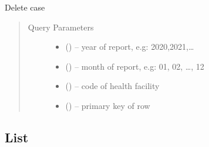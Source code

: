 \documentclass[letterpaper,10pt,english,openany,oneside]{sphinxmanual}
\begin{document}
\begin{fulllineitems}
\label{\detokenize{api/v4:post--api4-Reports-delete_hf_activity_case}}
\sphinxAtStartPar
Delete case
\begin{quote}\begin{description}
\item[{Query Parameters}] \leavevmode\begin{itemize}
\item {} 
\sphinxAtStartPar
{} () – year of report, e.g: 2020,2021,…

\item {} 
\sphinxAtStartPar
{} () – month of report, e.g: 01, 02, …, 12

\item {} 
\sphinxAtStartPar
{} () – code of health facility

\item {} 
\sphinxAtStartPar
{} () – primary key of row

\end{itemize}

\end{description}\end{quote}

\end{fulllineitems}



\subsection{List}
\label{\detokenize{api/v4:list}}
\end{document}
